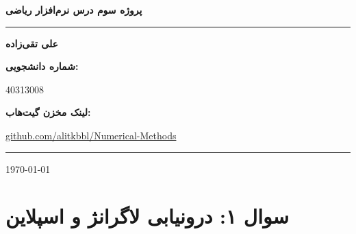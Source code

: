 \documentclass[12pt,a4paper]{article}
\begin{document}
	
	\begin{titlepage}
		\centering
		
		\vspace*{1cm}
		
		{\Huge\bfseries پروژه سوم درس نرم‌افزار ریاضی\par}
		\vspace{1.2cm}
		
		{\Large{}\par}
		\vspace{2.3cm}
		
		\rule{0.75\textwidth}{0.8pt}\par
		\vspace{1cm}
		
		{\Large\bfseries علی تقی‌زاده\par}
		
		\vspace{1.2cm}
		
		{\large\bfseries شماره دانشجویی:\par}
		\vspace{0.45cm}
		{\large 40313008\par}
		
		\vspace{0.8cm}
		
\vspace{0.8cm}

\vspace{0.8cm}

{\large\bfseries لینک مخزن گیت‌هاب:\par}
\vspace{0.35cm}
{\large\latinfont\href{https://github.com/alitkbbl/Numerical-Methods}{github.com/alitkbbl/Numerical-Methods}\par}



		\vfill
		
		\rule{0.75\textwidth}{0.8pt}\par
		\vspace{0.8cm}
		
		{\large \today\par}
		
	\end{titlepage}
	
	\newpage
	
	\section*{سوال ۱: درونیابی لاگرانژ و اسپلاین}
	
\end{document}
